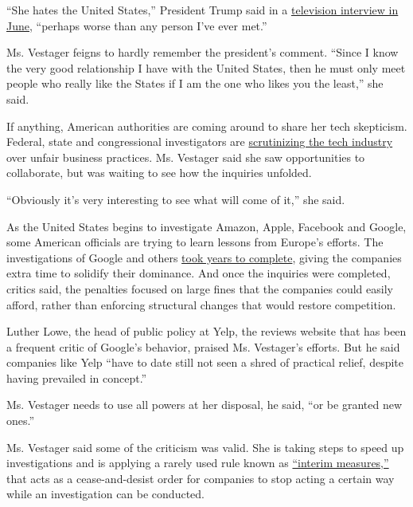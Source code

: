 ``She hates the United States,'' President Trump said in a
\href{https://www.nytimes3xbfgragh.onion/2019/06/26/business/economy/trump-china-tariffs-g20.html}{television
interview in June}, ``perhaps worse than any person I've ever met.''

Ms. Vestager feigns to hardly remember the president's comment. ``Since
I know the very good relationship I have with the United States, then he
must only meet people who really like the States if I am the one who
likes you the least,'' she said.

If anything, American authorities are coming around to share her tech
skepticism. Federal, state and congressional investigators are
\href{https://www.nytimes3xbfgragh.onion/2019/07/23/technology/justice-department-tech-antitrust.html}{scrutinizing
the tech industry} over unfair business practices. Ms. Vestager said she
saw opportunities to collaborate, but was waiting to see how the
inquiries unfolded.

``Obviously it's very interesting to see what will come of it,'' she
said.

As the United States begins to investigate Amazon, Apple, Facebook and
Google, some American officials are trying to learn lessons from
Europe's efforts. The investigations of Google and others
\href{https://www.nytimes3xbfgragh.onion/2019/11/11/business/europe-technology-antitrust-regulation.html}{took
years to complete}, giving the companies extra time to solidify their
dominance. And once the inquiries were completed, critics said, the
penalties focused on large fines that the companies could easily afford,
rather than enforcing structural changes that would restore competition.

Luther Lowe, the head of public policy at Yelp, the reviews website that
has been a frequent critic of Google's behavior, praised Ms. Vestager's
efforts. But he said companies like Yelp ``have to date still not seen a
shred of practical relief, despite having prevailed in concept.''

Ms. Vestager needs to use all powers at her disposal, he said, ``or be
granted new ones.''

Ms. Vestager said some of the criticism was valid. She is taking steps
to speed up investigations and is applying a rarely used rule known as
\href{https://www.nytimes3xbfgragh.onion/2019/10/16/business/-big-tech-europe-antitrust.html}{``interim
measures,''} that acts as a cease-and-desist order for companies to stop
acting a certain way while an investigation can be conducted.


